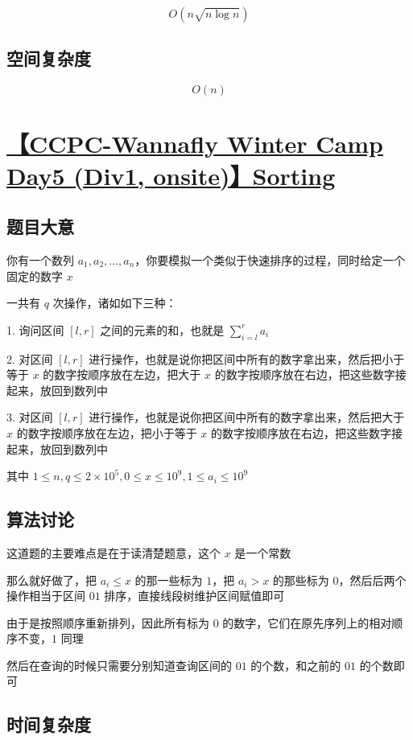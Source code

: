 \documentclass[UTF8]{article}
\begin{document}
$$
O(n \sqrt{n \log n})
$$

\subsection{空间复杂度}

$$
O(n)
$$

\section{\href{https://www.zhixincode.com/contest/20/problem/I?problem_id=304}{【CCPC-Wannafly Winter Camp Day5 (Div1, onsite)】Sorting}}

\subsection{题目大意}

你有一个数列 $a_1, a_2, \dots, a_n$，你要模拟一个类似于快速排序的过程，同时给定一个固定的数字 $x$

一共有 $q$ 次操作，诸如如下三种：

1. 询问区间 $[l, r]$ 之间的元素的和，也就是 $\sum_{i=l}^r a_i$

2. 对区间 $[l,r]$ 进行操作，也就是说你把区间中所有的数字拿出来，然后把小于等于 $x$ 的数字按顺序放在左边，把大于 $x$ 的数字按顺序放在右边，把这些数字接起来，放回到数列中

3. 对区间 $[l,r]$ 进行操作，也就是说你把区间中所有的数字拿出来，然后把大于 $x$ 的数字按顺序放在左边，把小于等于 $x$ 的数字按顺序放在右边，把这些数字接起来，放回到数列中

其中 $1 \le n,q \le 2 \times 10^5, 0 \le x \le 10^9, 1 \le a_i \le 10^9$

\subsection{算法讨论}

这道题的主要难点是在于读清楚题意，这个 $x$ 是一个常数

那么就好做了，把 $a_i \le x$ 的那一些标为 $1$，把 $a_i > x$ 的那些标为 $0$，然后后两个操作相当于区间 $01$ 排序，直接线段树维护区间赋值即可

由于是按照顺序重新排列，因此所有标为 $0$ 的数字，它们在原先序列上的相对顺序不变，$1$ 同理

然后在查询的时候只需要分别知道查询区间的 $01$ 的个数，和之前的 $01$ 的个数即可

\subsection{时间复杂度}
\end{document}
